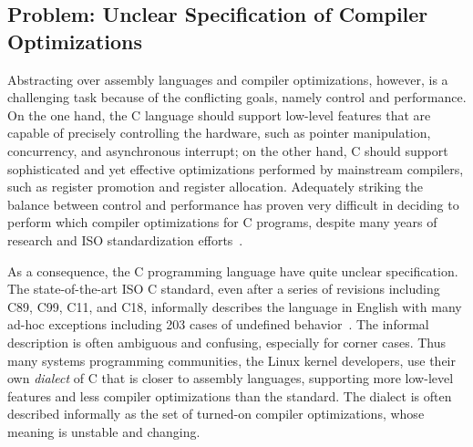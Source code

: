 



\subsection{Problem: Unclear Specification of Compiler Optimizations}
\label{sec:introduction:problem}

Abstracting over assembly languages and compiler optimizations, however, is a challenging task
because of the conflicting goals, namely control and performance.  On the one hand, the C language
should support low-level features that are capable of precisely controlling the hardware, such as
pointer manipulation, concurrency, and asynchronous interrupt; on the other hand, C should support
sophisticated and yet effective optimizations performed by mainstream compilers, such as register
promotion and register allocation.  Adequately striking the balance between control and performance
has proven very difficult in deciding to perform which compiler optimizations for C programs,
despite many years of research and ISO standardization efforts~\cite{c18}.

As a consequence, the C programming language have quite unclear specification.  The state-of-the-art
ISO C standard, even after a series of revisions including C89, C99, C11, and C18, informally
describes the language in English with many ad-hoc exceptions including 203 cases of undefined
behavior~\cite[J.2]{c18}.  The informal description is often ambiguous and confusing, especially for
corner cases.  Thus many systems programming communities, \eg{} the Linux kernel developers, use
their own \emph{dialect} of C that is closer to assembly languages, supporting more low-level
features and less compiler optimizations than the standard.  The dialect is often described
informally as the set of turned-on compiler optimizations, whose meaning is unstable and changing.

